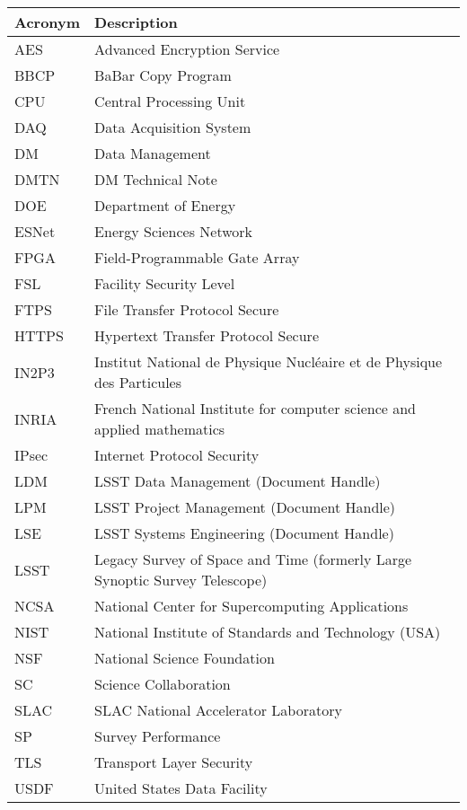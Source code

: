 \addtocounter{table}{-1}
\begin{longtable}{p{}p{}}\hline
\textbf{Acronym} & \textbf{Description}  \\\hline

AES & Advanced Encryption Service \\\hline
BBCP & BaBar Copy Program \\\hline
CPU & Central Processing Unit \\\hline
DAQ & Data Acquisition System \\\hline
DM & Data Management \\\hline
DMTN & DM Technical Note \\\hline
DOE & Department of Energy \\\hline
ESNet & Energy Sciences Network \\\hline
FPGA & Field-Programmable Gate Array \\\hline
FSL & Facility Security Level \\\hline
FTPS & File Transfer Protocol Secure \\\hline
HTTPS & Hypertext Transfer Protocol Secure \\\hline
IN2P3 & Institut National de Physique Nucléaire et de Physique des Particules \\\hline
INRIA & French National Institute for computer science and applied mathematics \\\hline
IPsec & Internet Protocol Security \\\hline
LDM & LSST Data Management (Document Handle) \\\hline
LPM & LSST Project Management (Document Handle) \\\hline
LSE & LSST Systems Engineering (Document Handle) \\\hline
LSST & Legacy Survey of Space and Time (formerly Large Synoptic Survey Telescope) \\\hline
NCSA & National Center for Supercomputing Applications \\\hline
NIST & National Institute of Standards and Technology (USA) \\\hline
NSF & National Science Foundation \\\hline
SC & Science Collaboration \\\hline
SLAC & SLAC National Accelerator Laboratory \\\hline
SP & Survey Performance \\\hline
TLS & Transport Layer Security \\\hline
USDF & United States Data Facility \\\hline
\end{longtable}
